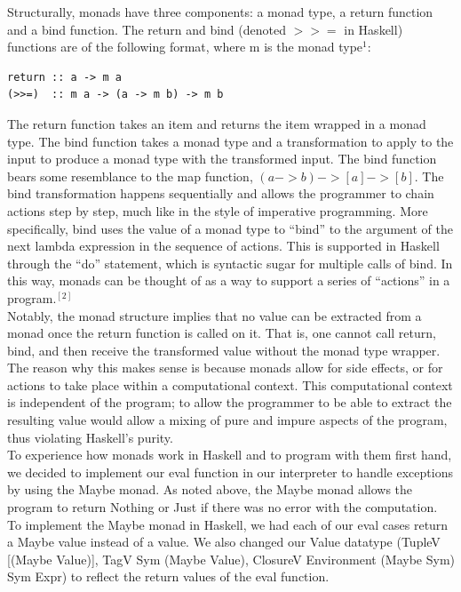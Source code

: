 \documentclass[journal]{IEEEtran}
\begin{document}
Structurally, monads have three components: a monad type, a return function and a bind function. The return and bind (denoted $>>=$ in Haskell) functions are of the following format, where m is the monad type$^{1}$:
\begin{verbatim}
return :: a -> m a
(>>=)  :: m a -> (a -> m b) -> m b
\end{verbatim}
  The return function takes an item and returns the item wrapped in a monad type. The bind function takes a monad type and a transformation to apply to the input to produce a monad type with the transformed input. The bind function bears some resemblance to the map function, $(a->b) -> [a] -> [b]$. The bind transformation happens sequentially and  allows the programmer to chain actions step by step, much like in the style of imperative programming. More specifically, bind uses the value of a monad type to “bind” to the argument of the next lambda expression in the sequence of actions. This is supported in Haskell through the “do” statement, which is syntactic sugar for multiple calls of bind. In this way, monads can be thought of as a way to support a series of “actions” in a program.$^[2]$\\

Notably, the monad structure implies that no value can be extracted from a monad once the return function is called on it. That is, one cannot call return, bind, and then receive the transformed value without the monad type wrapper. The reason why this makes sense is because monads allow for side effects, or for actions to take place within a computational context. This computational context is independent of the program; to allow the programmer to be able to extract the resulting value would allow a mixing of pure and impure aspects of the program, thus violating Haskell's purity. \\

To experience how monads work in Haskell and to program with them first hand, we decided to implement our eval function in our interpreter to handle exceptions by using the Maybe monad. As noted above, the Maybe monad allows the program to return Nothing or Just if there was no error with the computation. To implement the Maybe monad in Haskell, we had each of our eval cases return a Maybe value instead of a value. We also changed our Value datatype (TupleV [(Maybe Value)], TagV Sym (Maybe Value),  ClosureV Environment (Maybe Sym) Sym Expr) to reflect the return values of the eval function.\\ 
\end{document}
